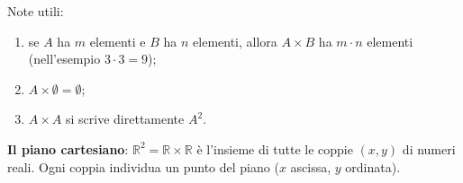 \documentclass[11pt,a4paper]{article}
\begin{document}
Note utili:
\begin{enumerate}
    \item se $A$ ha $m$ elementi e $B$ ha $n$ elementi, allora
          $A \times B$ ha $m \cdot n$ elementi (nell'esempio $3 \cdot 3 = 9$);
    \item $A \times \emptyset = \emptyset$;
    \item $A \times A$ si scrive direttamente $A^2$.
\end{enumerate}

\textbf{Il piano cartesiano}: $\mathbb{R}^2 = \mathbb{R} \times \mathbb{R}$
è l'insieme di tutte le coppie $(x, y)$ di numeri reali. Ogni coppia
individua un punto del piano ($x$ ascissa, $y$ ordinata).
\end{document}
